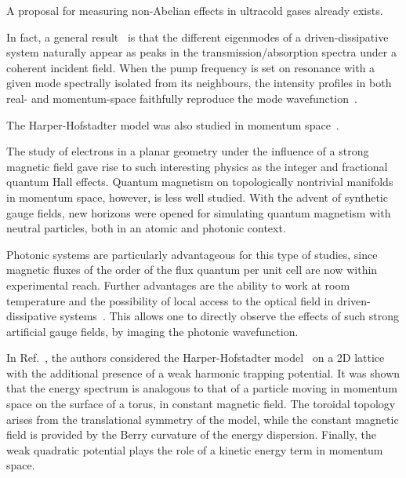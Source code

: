 \documentclass[twocolumn, 10pt, aps, superscriptaddress, floatfix, showpacs, pra, citeautoscript]{revtex4-1}
\newcommand{\co}[2]{#2}
\renewcommand{\paragraph}{\co}
\begin{document}
A proposal for measuring non-Abelian effects in ultracold gases already exists.~\cite{Grusdt2014nonabelian}

In fact, a general result~\cite{carusotto2013fluids} is that the different eigenmodes
of a driven-dissipative system naturally appear as peaks in the
transmission/absorption spectra under a coherent incident field. When
the pump frequency is set on resonance with a given mode spectrally
isolated from its neighbours, the intensity profiles in both real- and
momentum-space faithfully reproduce the mode wavefunction~\cite{carusotto2013fluids}.

The Harper-Hofstadter model was also studied in momentum
space~\cite{ozawa2014momhh}.

\paragraph{Quantum magnetism is interesting, even more so in momentum space.}
The study of electrons in a planar geometry under the influence of a
strong magnetic field gave rise to such interesting physics as the
integer and fractional quantum Hall effects. Quantum magnetism on
topologically nontrivial manifolds in momentum space, however, is less
well studied.  With the advent of synthetic gauge fields, new horizons
were opened for simulating quantum magnetism with neutral particles,
both in an atomic and photonic context.

\paragraph{Photonic systems are a good canditate for magnetism.}
Photonic systems are particularly advantageous for this type of
studies, since magnetic fluxes of the order of the flux quantum per
unit cell are now within experimental reach. Further advantages are
the ability to work at room temperature and the possibility of local
access to the optical field in driven-dissipative
systems~\cite{carusotto2013fluids}. This allows one to directly
observe the effects of such strong artificial gauge fields, by imaging
the photonic wavefunction.

\paragraph{Momentum space dual of HH model provides new insights.}
In Ref.~, the authors considered the
Harper-Hofstadter
model~\cite{harper1955magnetic,hofstadter1976butterfly} on a 2D
lattice with the additional presence of a weak harmonic trapping
potential. It was shown that the energy spectrum is analogous to that
of a particle moving in momentum space on the surface of a torus, in
constant magnetic field.  The toroidal topology arises from the
translational symmetry of the model, while the constant magnetic field
is provided by the Berry curvature of the energy dispersion. Finally,
the weak quadratic potential plays the role of a kinetic energy term
in momentum space.
\end{document}
